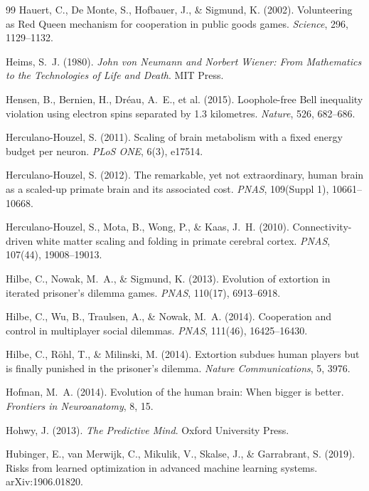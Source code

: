 \documentclass[11pt,twocolumn]{article}
\begin{document}
\begin{thebibliography}{99}
 Hauert, C., De Monte, S., Hofbauer, J., \& Sigmund, K. (2002). Volunteering as Red Queen mechanism for cooperation in public goods games. \emph{Science}, 296, 1129--1132.

 Heims, S.~J. (1980). \emph{John von Neumann and Norbert Wiener: From Mathematics to the Technologies of Life and Death}. MIT Press.

 Hensen, B., Bernien, H., Dréau, A.~E., et al. (2015). Loophole-free Bell inequality violation using electron spins separated by 1.3 kilometres. \emph{Nature}, 526, 682--686.

 Herculano-Houzel, S. (2011). Scaling of brain metabolism with a fixed energy budget per neuron. \emph{PLoS ONE}, 6(3), e17514.

 Herculano-Houzel, S. (2012). The remarkable, yet not extraordinary, human brain as a scaled-up primate brain and its associated cost. \emph{PNAS}, 109(Suppl 1), 10661--10668.

 Herculano-Houzel, S., Mota, B., Wong, P., \& Kaas, J.~H. (2010). Connectivity-driven white matter scaling and folding in primate cerebral cortex. \emph{PNAS}, 107(44), 19008--19013.

 Hilbe, C., Nowak, M.~A., \& Sigmund, K. (2013). Evolution of extortion in iterated prisoner's dilemma games. \emph{PNAS}, 110(17), 6913--6918.

 Hilbe, C., Wu, B., Traulsen, A., \& Nowak, M.~A. (2014). Cooperation and control in multiplayer social dilemmas. \emph{PNAS}, 111(46), 16425--16430.

 Hilbe, C., Röhl, T., \& Milinski, M. (2014). Extortion subdues human players but is finally punished in the prisoner's dilemma. \emph{Nature Communications}, 5, 3976.

 Hofman, M.~A. (2014). Evolution of the human brain: When bigger is better. \emph{Frontiers in Neuroanatomy}, 8, 15.

 Hohwy, J. (2013). \emph{The Predictive Mind}. Oxford University Press.

 Hubinger, E., van Merwijk, C., Mikulik, V., Skalse, J., \& Garrabrant, S. (2019). Risks from learned optimization in advanced machine learning systems. arXiv:1906.01820.


\end{thebibliography}
\end{document}
